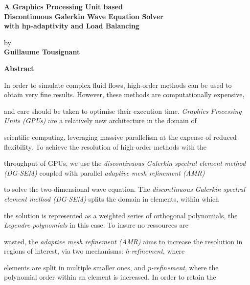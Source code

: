 \thispagestyle{plain} %

\begin{center}
	\vspace*{0.5cm} %
	{ \Large
		\textbf{A Graphics Processing Unit based \\ 
			Discontinuous Galerkin Wave Equation Solver \\
			with hp-adaptivity and Load Balancing \\
		}
	}
	\vspace{0.4cm}
	\large

	by \\
	\vspace{0.4cm}
	\textbf{Guillaume Tousignant}
	
	\vspace{0.9cm}
	\textbf{Abstract}
	
\end{center}

In order to simulate complex fluid flows, high-order methods can be used to obtain very fine results. However, these methods are computationally expensive, 

and care should be taken to optimise their execution time. \textit{Graphics Processing Units (GPUs)} are a relatively new architecture in the domain of 

scientific computing, leveraging massive parallelism at the expense of reduced flexibility. To achieve the resolution of high-order methods with the 

throughput of GPUs, we use the \textit{discontinuous Galerkin spectral element method (DG-SEM)} coupled with parallel \textit{adaptive mesh refinement (AMR)}

to solve the two-dimensional wave equation. The \textit{discontinuous Galerkin spectral element method (DG-SEM)} splits the domain in elements, within which

the solution is represented as a weighted series of orthogonal polynomials, the \textit{Legendre polynomials} in this case. To insure no ressources are 

wasted, the \textit{adaptive mesh refinement (AMR)} aims to increase the resolution in regions of interest, via two mechanisms: \textit{h-refinement}, where

elements are split in multiple smaller ones, and \textit{p-refinement}, where the polynomial order within an element is increased. In order to retain the 

